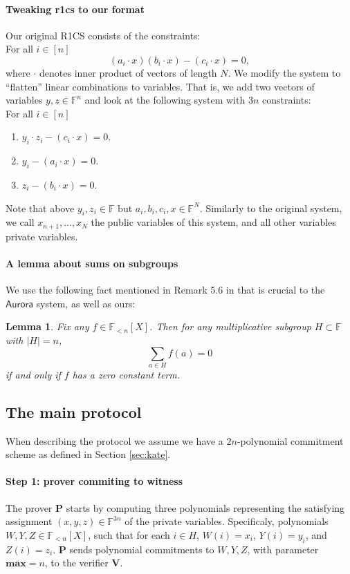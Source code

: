 \documentclass[11pt]{article}
\numberwithin{figure}{section} %
\newtheorem{lemma}[thm]{Lemma}
\renewcommand{\max}{\ensuremath{\mathrm{\mathbf{max}}}\xspace}
\newcommand{\summa}{\ensuremath{\sum_{a\in H}}\xspace}
\newcommand{\F}{\ensuremath{\mathbb F}\xspace}
\newcommand{\prv}{\ensuremath{\mathsf{\mathbf{P}}}\xspace}
\newcommand{\ver}{\ensuremath{\mathsf{\mathbf{V}}}\xspace}
\newcommand{\aurora}{\ensuremath{\mathsf{Aurora}}\xspace}
\newcommand{\polysofdeg}[1]{\ensuremath{\F_{< #1}[X]}\xspace}
\begin{document}
\paragraph{Tweaking r1cs to our format}
Our original R1CS consists of the constraints:\\
For all $i\in [n]$
\[(a_i\cdot x)(b_i\cdot x) - (c_i\cdot x) = 0,\]
where $\cdot$ denotes inner product of vectors of length $N$. We modify the system to “flatten” linear combinations to variables. That is, we add two vectors of variables $y, z\in  \F^n$ and look at the following system with $3n$ constraints:\\
\noindent
For all $i\in [n]$
\begin{enumerate}
\item  $y_i\cdot z_i - (c_i\cdot x) = 0$.
\item $y_i - (a_i\cdot x) = 0$.
\item $z_i - (b_i\cdot x) = 0$.
\end{enumerate}
Note that above $y_i, z_i\in\F$ but $a_i,b_i,c_i,x \in\F^N$.
Similarly to the original system, we call
$x_{n+1}, . . . , x_N$ the public variables of this system, and all other variables private variables.

\paragraph{A lemma about sums on subgroups}
We use the following fact mentioned in Remark 5.6 in \cite{aurora} that is crucial to the \aurora system, as well as ours:
\begin{lemma}\label{lem:sumcoeff}
Fix any $f\in\polysofdeg{n}$. Then for any multiplicative subgroup $H\subset \F$ with $|H| = n$,
\[\summa f(a) = 0\]
if and only if $f$ has a zero constant term. 
\end{lemma}

\subsection{The main protocol}
When describing the protocol we assume we have a $2n$-polynomial commitment scheme as defined in Section \ref{sec:kate}.

\paragraph{Step 1: prover commiting to witness}
The prover \prv starts by computing three polynomials representing the satisfying assignment $(x, y, z) \in\F^{3n}$ of the private variables. Specificaly, polynomials $W, Y, Z \in \polysofdeg{n}$, such that for each $i\in H$,
$W(i) = x_i$, $Y (i) = y_i$, and $Z(i) = z_i$.
\prv sends polynomial commitments to $W, Y, Z$, with parameter $\max=n$, to the verifier \ver.
\end{document}
